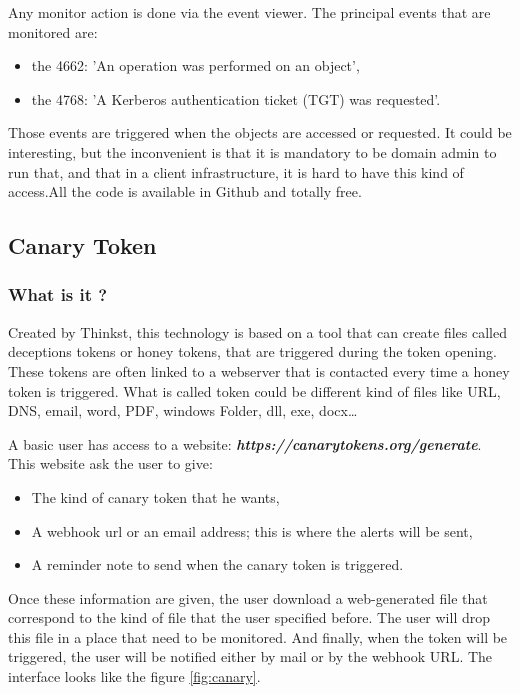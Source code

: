 \documentclass{tnreport}
\begin{document}
Any monitor action is done via the event viewer. The principal events that are monitored are: 
\begin{itemize}
    \item the 4662: 'An operation was performed on an object',
    \item the 4768: 'A Kerberos authentication ticket (TGT) was requested'.
\end{itemize}
Those events are triggered when the objects are accessed or requested. It could be interesting, but the inconvenient is that it is mandatory to be domain admin to run that, and that in a client infrastructure, it is hard to have this kind of access.\eol All the code is available in Github and totally free.

\subsection{Canary Token \cite{lib9}}
\subsubsection{What is it ?}
Created by Thinkst, this technology is based on a tool that can create files called deceptions tokens or honey tokens, that are triggered during the token opening. These tokens are often linked to a webserver that is contacted every time a honey token is triggered. What is called token could be different kind of files like URL, DNS, email, word, PDF, windows Folder, dll, exe, docx…

A basic user has access to a website: \textbf{\textit{https://canarytokens.org/generate}}. This website ask the user to give:
\begin{itemize}
    \item The kind of canary token that he wants,
    \item A webhook url or an email address; this is where the alerts will be sent,
    \item A reminder note to send when the canary token is triggered.
\end{itemize}
Once these information are given, the user download a web-generated file that correspond to the kind of file that the user specified before. The user will drop this file in a place that need to be monitored. And finally, when the token will be triggered, the user will be notified either by mail or by the webhook URL.
The interface looks like the figure \ref{fig:canary}.
\end{document}
